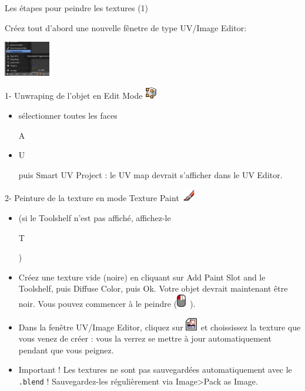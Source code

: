 \documentclass[compress]{beamer}
\newcommand{\key}[1]{

    \begin{tcolorbox}[tcbox raise=-1mm,center upper,colback=yellow!20!white,top=1.3pt,right=3pt,left=3pt,boxsep=0pt,boxrule=0.4pt,hbox,height=5mm,bottomrule=1mm]%
        {\normalsize \sc #1}%
    \end{tcolorbox}
}
\newcommand{\lmb}{\includegraphics[height=1.5em]{LMB}~}
\newcommand{\emode}{\includegraphics[height=1.5em]{edit_mode}~}
\newcommand{\tmode}{\includegraphics[height=1.5em]{texpaint_mode}~}
\newcommand{\imageicon}{\includegraphics[height=1.5em]{image_icon}~}
\begin{document}
\begin{frame}{Les étapes pour peindre les textures (1)}
    \tiny
    \begin{multicols}{2}
        Créez tout d'abord une nouvelle fênetre de type {\Medium UV/Image Editor}:\\
        \begin{center}
        \includegraphics[width=2cm]{uv-image-window}
        \end{center}

        1- {\Medium Unwraping} de l'objet en {\Medium Edit Mode \emode}
        \begin{itemize}[leftmargin=0.1cm]
            \item sélectionner toutes les faces \key{A}
            \item \key{U} puis {\Medium Smart UV Project} : le UV map devrait s'afficher dans le UV Editor.
        \end{itemize}

        2- Peinture de la texture en mode {\Medium Texture Paint \tmode}
        \begin{itemize}[leftmargin=0.1cm]
            \item (si le Toolshelf n'est pas affiché, affichez-le \key{T})
            \item Créez une texture vide (noire) en cliquant sur {\Medium Add
                Paint Slot} and le Toolshelf, puis {\Medium Diffuse Color}, puis
                {\Medium Ok}. Votre objet devrait maintenant être noir.  Vous
                pouvez commencer à le peindre (\lmb).
            \item Dans la fenêtre {\Medium UV/Image Editor}, cliquez sur
                \imageicon et choississez la texture que vous venez de créer :
                vous la verrez se mettre à jour automatiquement pendant que vous
                peignez.
            \item {\Medium Important !} Les textures ne sont pas sauvegardées
                automatiquement avec le {\tt .blend} ! Sauvegardez-les régulièrement
                via {\Medium Image>Pack as Image}.

        \end{itemize}
    \end{multicols}

\end{frame}
\end{document}
